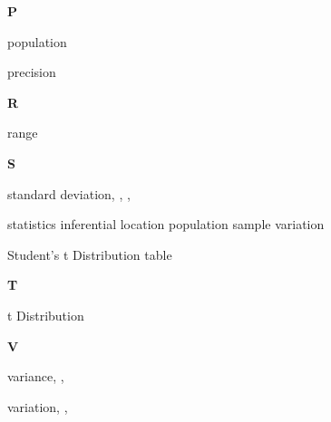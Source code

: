 \begin{theindex}
  \indexspace

{\Large\textbf
P
}\hfill\nopagebreak

  \item population\dotfill {}
  \item precision\dotfill {}

  \indexspace

{\Large\textbf
R
}\hfill\nopagebreak

  \item range\dotfill {}

  \indexspace

{\Large\textbf
S
}\hfill\nopagebreak

  \item standard deviation\dotfill {}, , 
		, 
  \item statistics
    \subitem inferential\dotfill {}
    \subitem location\dotfill {}
    \subitem population\dotfill {}
    \subitem sample\dotfill {}
    \subitem variation\dotfill {}
  \item Student's t Distribution
    \subitem table\dotfill {}

  \indexspace

{\Large\textbf
T
}\hfill\nopagebreak

  \item t Distribution\dotfill {}

  \indexspace

{\Large\textbf
V
}\hfill\nopagebreak

  \item variance\dotfill {}, , 
  \item variation\dotfill {}, , 

\end{theindex}
